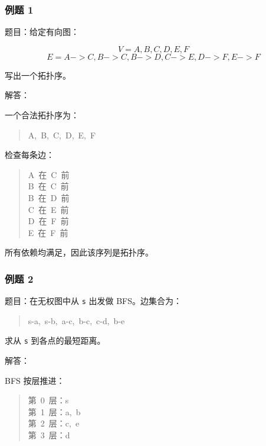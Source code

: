 \documentclass[UTF8,zihao=-4]{ctexart}
\begin{document}
\subsubsection*{例题 1}

题目：给定有向图：

\[V = {A, B, C, D, E, F}\]
\[E = {A->C, B->C, B->D, C->E, D->F, E->F}\]

写出一个拓扑序。

解答：

一个合法拓扑序为：

\begin{quote}
\small\ttfamily\raggedright
\relax A,\ B,\ C,\ D,\ E,\ F\\
\end{quote}

检查每条边：

\begin{quote}
\small\ttfamily\raggedright
\relax A\ 在\ C\ 前\\
\relax B\ 在\ C\ 前\\
\relax B\ 在\ D\ 前\\
\relax C\ 在\ E\ 前\\
\relax D\ 在\ F\ 前\\
\relax E\ 在\ F\ 前\\
\end{quote}

所有依赖均满足，因此该序列是拓扑序。

\subsubsection*{例题 2}

题目：在无权图中从 \texttt{s} 出发做 BFS。边集合为：

\begin{quote}
\small\ttfamily\raggedright
\relax s-a,\ s-b,\ a-c,\ b-c,\ c-d,\ b-e\\
\end{quote}

求从 \texttt{s} 到各点的最短距离。

解答：

BFS 按层推进：

\begin{quote}
\small\ttfamily\raggedright
\relax 第\ 0\ 层：s\\
\relax 第\ 1\ 层：a,\ b\\
\relax 第\ 2\ 层：c,\ e\\
\relax 第\ 3\ 层：d\\
\end{quote}
\end{document}
